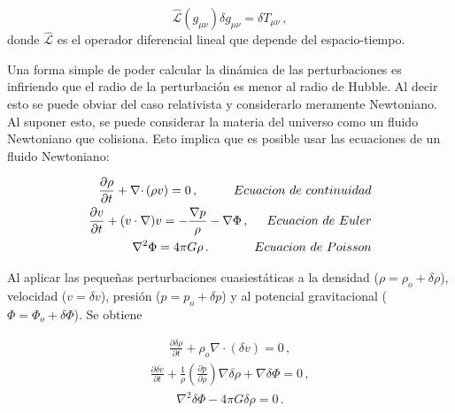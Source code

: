 \begin{equation}
\hat{\mathcal{L}}(g_{\mu\nu})\delta g_{\mu\nu} = \delta T_{\mu\nu} \,,
\end{equation}
%
donde $\hat{\mathcal{L}}$ es el operador diferencial lineal que depende del espacio-tiempo. 
 
Una forma simple de poder calcular la dinámica de las perturbaciones es infiriendo que el radio de la perturbación es menor al radio de Hubble. Al decir esto se puede obviar del caso relativista y considerarlo meramente Newtoniano. Al suponer esto, se puede considerar la materia del universo como un fluido Newtoniano que colisiona. Esto implica que es posible usar las ecuaciones de un fluido Newtoniano:

\begin{eqnarray}
\frac{\partial \rho}{\partial t} + \nabla\cdotp(\rho v) = 0\,, \hspace{1cm} Ecuacion\ de\ continuidad \\
\label{eq: Navier-Stoke1}
\frac{\partial v}{\partial t} +(v\cdot \nabla)v = -\frac{\nabla p}{\rho}- \nabla\Phi \,,  \hspace{0.5cm} Ecuacion\ de\ Euler\\
\label{eq: Navier-Stoke2}
\nabla^{2}\Phi = 4\pi G\rho\,. \hspace{1.3cm} Ecuacion\ de\ Poisson\\
\label{eq: Navier-Stoke3}
\end{eqnarray}

Al aplicar las pequeñas perturbaciones cuasiestáticas a la densidad ($\rho=\rho_{o}+\delta\rho$), velocidad ($v=\delta v$), presión ($p=p_{o}+\delta p$) y al potencial gravitacional ($\Phi=\Phi_{o}+\delta\Phi$). Se obtiene 

\begin{align}
\frac{\partial \delta\rho}{\partial t} + \rho_{o}\nabla\cdotp(\delta v) = 0\,,
\label{eq:Navier-stoke1_perturbation}
\end{align}
\begin{align}
\frac{\partial \delta v}{\partial t} + \frac{1}{\rho}\left(\frac{\partial p}{\partial \rho} \right)\nabla \delta \rho+ \nabla\delta\Phi =0\,,
\label{eq:Navier-stoke2_perturbation}
\end{align}
\begin{align}
\nabla^{2}\delta\Phi - 4\pi G\delta\rho = 0\,.
\label{eq:Navier-stoke3_perturbation}
\end{align}	

